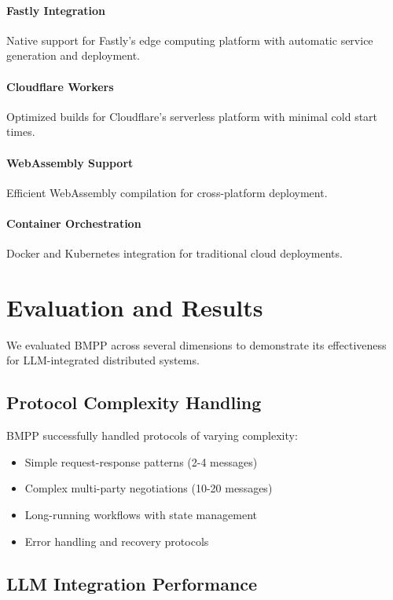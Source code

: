 \documentclass[11pt,a4paper]{article}
\begin{document}
	\paragraph{Fastly Integration} Native support for Fastly's edge computing platform with automatic service generation and deployment.
	
	\paragraph{Cloudflare Workers} Optimized builds for Cloudflare's serverless platform with minimal cold start times.
	
	\paragraph{WebAssembly Support} Efficient WebAssembly compilation for cross-platform deployment.
	
	\paragraph{Container Orchestration} Docker and Kubernetes integration for traditional cloud deployments.
	
	\section{Evaluation and Results}
	\label{sec:evaluation}
	
	We evaluated BMPP across several dimensions to demonstrate its effectiveness for LLM-integrated distributed systems.
	
	\subsection{Protocol Complexity Handling}
	\label{subsec:complexity}
	
	BMPP successfully handled protocols of varying complexity:
	\begin{itemize}
		\item Simple request-response patterns (2-4 messages)
		\item Complex multi-party negotiations (10-20 messages)
		\item Long-running workflows with state management
		\item Error handling and recovery protocols
	\end{itemize}
	
	\subsection{LLM Integration Performance}
	\label{subsec:llm-performance}
	
\end{document}
